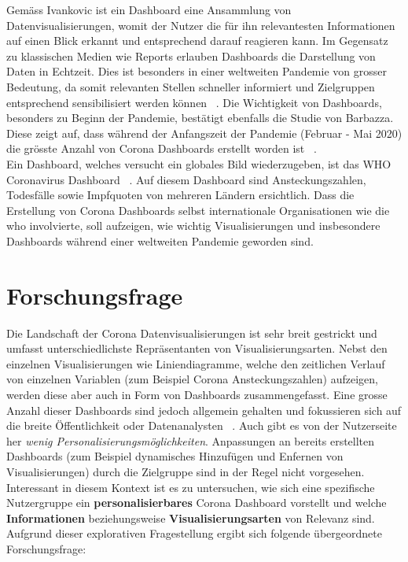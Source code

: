 \documentclass[12pt, oneside]{article}
\begin{document}
Gemäss Ivankovic ist ein Dashboard eine Ansammlung von Datenvisualisierungen, womit der Nutzer die für ihn relevantesten Informationen auf einen Blick erkannt und entsprechend darauf reagieren kann. Im Gegensatz zu klassischen Medien wie Reports erlauben Dashboards die Darstellung von Daten in Echtzeit. Dies ist besonders in einer weltweiten Pandemie von grosser Bedeutung, da somit relevanten Stellen schneller informiert und Zielgruppen entsprechend sensibilisiert werden können ~\citep[S. 2]{Ivankovic.2021}. Die Wichtigkeit von Dashboards, besonders zu Beginn der Pandemie, bestätigt ebenfalls die Studie von Barbazza. Diese zeigt auf, dass während der Anfangszeit der Pandemie (Februar - Mai 2020) die grösste Anzahl von Corona Dashboards erstellt worden ist ~\citep[S. 8]{Barbazza.2021}.\\

Ein Dashboard, welches versucht ein globales Bild wiederzugeben, ist das WHO Coronavirus Dashboard ~\citep{WHO.23.04.2022}. Auf diesem Dashboard sind Ansteckungszahlen, Todesfälle sowie Impfquoten von mehreren Ländern ersichtlich. Dass die Erstellung von Corona Dashboards selbst internationale Organisationen wie die \Gls{who} involvierte, soll aufzeigen, wie wichtig Visualisierungen und insbesondere Dashboards während einer weltweiten Pandemie geworden sind.
\clearpage

\section{Forschungsfrage}
Die Landschaft der Corona Datenvisualisierungen ist sehr breit gestrickt und umfasst unterschiedlichste Repräsentanten von Visualisierungsarten. Nebst den einzelnen Visualisierungen wie Liniendiagramme, welche den zeitlichen Verlauf von einzelnen Variablen (zum Beispiel Corona Ansteckungszahlen) aufzeigen, werden diese aber auch in Form von Dashboards zusammengefasst. Eine grosse Anzahl dieser Dashboards sind jedoch  allgemein gehalten und fokussieren sich auf die breite Öffentlichkeit oder Datenanalysten ~\citep[S. 14]{Barbazza.2021}. Auch gibt es von der Nutzerseite her \textit{wenig Personalisierungsmöglichkeiten}. Anpassungen an bereits erstellten Dashboards (zum Beispiel dynamisches Hinzufügen und Enfernen von Visualisierungen) durch die Zielgruppe sind in der Regel nicht vorgesehen. Interessant in diesem Kontext ist es zu untersuchen, wie sich eine spezifische Nutzergruppe ein \textbf{personalisierbares} Corona Dashboard vorstellt und welche \textbf{Informationen} beziehungsweise \textbf{Visualisierungsarten} von Relevanz sind. Aufgrund dieser explorativen Fragestellung ergibt sich folgende übergeordnete Forschungsfrage:
\end{document}
